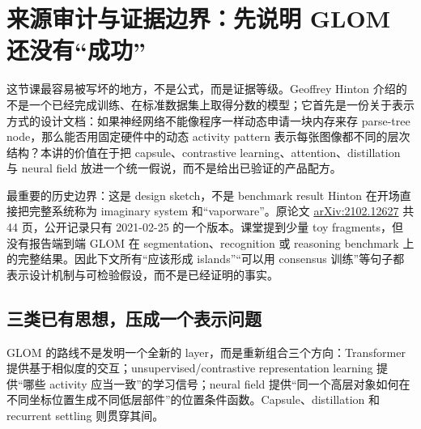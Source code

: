 \section{来源审计与证据边界：先说明 GLOM 还没有“成功”}

这节课最容易被写坏的地方，不是公式，而是证据等级。Geoffrey Hinton 介绍的  不是一个已经完成训练、在标准数据集上取得分数的模型；它首先是一份关于表示方式的设计文档：如果神经网络不能像程序一样动态申请一块内存来存 parse-tree node，那么能否用固定硬件中的动态 activity pattern 表示每张图像都不同的层次结构？本讲的价值在于把 capsule、contrastive learning、attention、distillation 与 neural field 放进一个统一假说，而不是给出已验证的产品配方。


\begin{warningbox}{最重要的历史边界：这是 design sketch，不是 benchmark result}
Hinton 在开场直接把完整系统称为 imaginary system 和“vaporware”。原论文 \href{https://arxiv.org/abs/2102.12627}{arXiv:2102.12627} 共 44 页，公开记录只有 2021-02-25 的一个版本。课堂提到少量 toy fragments，但没有报告端到端 GLOM 在 segmentation、recognition 或 reasoning benchmark 上的完整结果。因此下文所有“应该形成 islands”“可以用 consensus 训练”等句子都表示设计机制与可检验假设，而不是已经证明的事实。
\end{warningbox}


\subsection{三类已有思想，压成一个表示问题}

GLOM 的路线不是发明一个全新的 layer，而是重新组合三个方向：Transformer 提供基于相似度的交互；unsupervised/contrastive representation learning 提供“哪些 activity 应当一致”的学习信号；neural field 提供“同一个高层对象如何在不同坐标位置生成不同低层部件”的位置条件函数。Capsule、distillation 和 recurrent settling 则贯穿其间。


